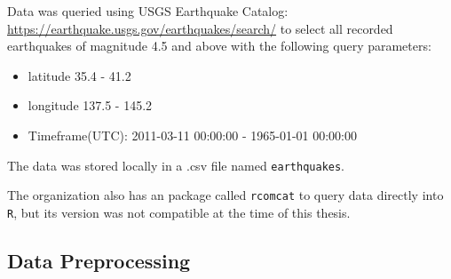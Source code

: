 

Data was queried using USGS Earthquake Catalog:
\url{https://earthquake.usgs.gov/earthquakes/search/} to select all
recorded earthquakes of magnitude 4.5 and above with the following query
parameters:

\begin{itemize}
\tightlist
\item
  latitude 35.4 - 41.2
\item
  longitude 137.5 - 145.2
\item
  Timeframe(UTC): 2011-03-11 00:00:00 - 1965-01-01 00:00:00
\end{itemize}

The data was stored locally in a .csv file named \texttt{earthquakes}.

The organization also has an package called \texttt{rcomcat} to query
data directly into \texttt{R}, but its version was not compatible at the
time of this thesis.

\hypertarget{data-preprocessing}{%
\subsection{Data Preprocessing}\label{data-preprocessing}}

